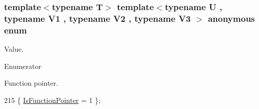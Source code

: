 \subsubsection[{\texorpdfstring{anonymous enum}{anonymous enum}}]{\setlength{\rightskip}{0pt plus 5cm}template$<$typename T$>$ template$<$typename U , typename V1 , typename V2 , typename V3 $>$ anonymous enum}\hypertarget{structTypeTraits_1_1FunctionPtrTraits_3_01U_07_5_08_07V1_00_01V2_00_01V3_08_4_abb2f8fa09ff4ad1a559879200dcfe317}{}\label{structTypeTraits_1_1FunctionPtrTraits_3_01U_07_5_08_07V1_00_01V2_00_01V3_08_4_abb2f8fa09ff4ad1a559879200dcfe317}
Value. \begin{Desc}
\item[Enumerator]\par
\begin{description}
\item[{\em 
Is\+Function\+Pointer\hypertarget{structTypeTraits_1_1FunctionPtrTraits_3_01U_07_5_08_07V1_00_01V2_00_01V3_08_4_abb2f8fa09ff4ad1a559879200dcfe317a9d51542047f2e38642d83bab97244114}{}\label{structTypeTraits_1_1FunctionPtrTraits_3_01U_07_5_08_07V1_00_01V2_00_01V3_08_4_abb2f8fa09ff4ad1a559879200dcfe317a9d51542047f2e38642d83bab97244114}
}]Function pointer. \end{description}
\end{Desc}

\begin{DoxyCode}
215 \{ \hyperlink{structTypeTraits_1_1FunctionPtrTraits_3_01U_07_5_08_07V1_00_01V2_00_01V3_08_4_abb2f8fa09ff4ad1a559879200dcfe317a9d51542047f2e38642d83bab97244114}{IsFunctionPointer} = 1    \};
\end{DoxyCode}
